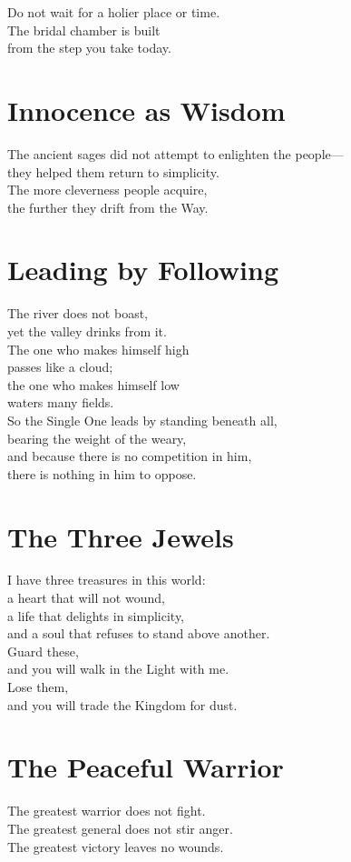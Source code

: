 \documentclass[10pt, openright]{book}
\begin{document}
Do not wait for a holier place or time. \\
The bridal chamber is built \\
from the step you take today.

\section{Innocence as Wisdom}
The ancient sages did not attempt to enlighten the people— \\
they helped them return to simplicity. \\
The more cleverness people acquire, \\
the further they drift from the Way.

\section{Leading by Following}
The river does not boast, \\
yet the valley drinks from it. \\
The one who makes himself high \\
passes like a cloud; \\
the one who makes himself low \\
waters many fields. \\

So the Single One leads by standing beneath all, \\
bearing the weight of the weary, \\
and because there is no competition in him, \\
there is nothing in him to oppose.

\section{The Three Jewels}
I have three treasures in this world: \\
a heart that will not wound, \\
a life that delights in simplicity, \\
and a soul that refuses to stand above another. \\

Guard these, \\
and you will walk in the Light with me. \\
Lose them, \\
and you will trade the Kingdom for dust.

\section{The Peaceful Warrior}
The greatest warrior does not fight. \\
The greatest general does not stir anger. \\
The greatest victory leaves no wounds. \\
\end{document}
